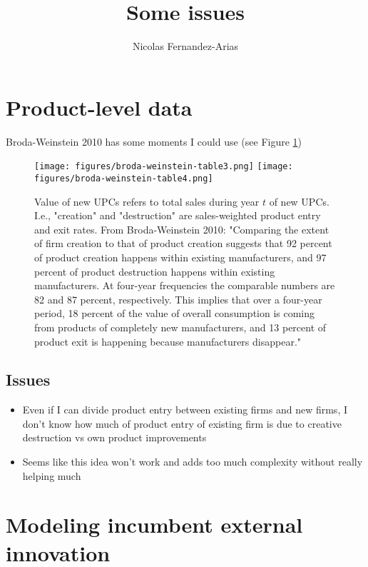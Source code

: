 \documentclass[12pt,english]{article}
\theoremstyle{remark}
\begin{document}
	
\title{Some issues}
\author{Nicolas Fernandez-Arias}
\maketitle

\section{Product-level data}

Broda-Weinstein 2010 has some moments I could use (see Figure \ref{broda-weinstein-2010-figs})

\begin{figure}[h]	
	\center
	\texttt{[image: figures/broda-weinstein-table3.png]}
	\texttt{[image: figures/broda-weinstein-table4.png]}
	\caption{Value of new UPCs refers to total sales during year $t$ of new UPCs. I.e., "creation" and "destruction" are sales-weighted product entry and exit rates.  From Broda-Weinstein 2010: "Comparing the extent of firm creation to that of product creation suggests that 92 percent of product creation happens within existing manufacturers, and 97 percent of product destruction happens within existing manufacturers. At four-year frequencies the comparable numbers are 82 and 87 percent, respectively. This implies that over a four-year period, 18 percent of the value of overall consumption is coming from products of completely new manufacturers, and 13 percent of product exit is happening because manufacturers disappear."}
	\label{broda-weinstein-2010-figs}
\end{figure}

\subsection{Issues}

\begin{itemize}
	\item Even if I can divide product entry between existing firms and new firms, I don't know how much of product entry of existing firm is due to creative destruction vs own product improvements
	\item Seems like this idea won't work and adds too much complexity without really helping much
\end{itemize}

\section{Modeling incumbent external innovation}
\end{document}
